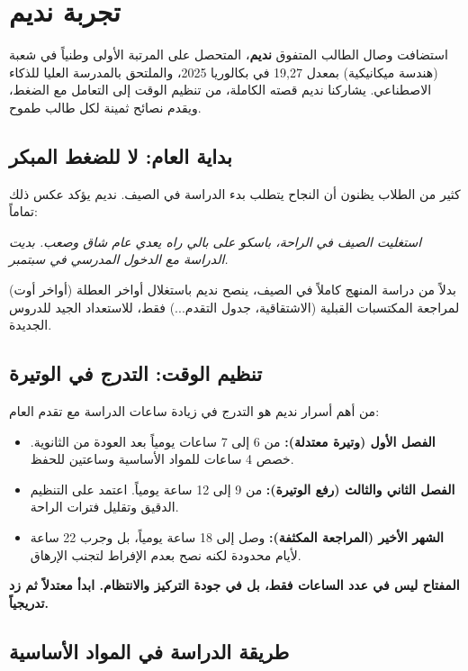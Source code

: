 \documentclass[12pt,a4paper]{book}
\newcommand{\quoteAr}[1]{%
	\begin{myquote}
		\itshape #1
	\end{myquote}
}
\newcommand{\importantAr}[1]{%
	\begin{important}
		\bfseries #1
	\end{important}
}
\begin{document}
	
	
	\section{تجربة نديم}
	
	استضافت وصال الطالب المتفوق \textbf{نديم}، المتحصل على المرتبة الأولى وطنياً في شعبة  (هندسة ميكانيكية) بمعدل 19,27 في بكالوريا 2025، والملتحق بالمدرسة العليا للذكاء الاصطناعي. يشاركنا نديم قصته الكاملة، من تنظيم الوقت إلى التعامل مع الضغط، ويقدم نصائح ثمينة لكل طالب طموح.
	
	\subsection{بداية العام: لا للضغط المبكر}
	كثير من الطلاب يظنون أن النجاح يتطلب بدء الدراسة في الصيف. نديم يؤكد عكس ذلك تماماً:
	\quoteAr{استغليت الصيف في الراحة، باسكو على بالي راه يعدي عام شاق وصعب. بديت الدراسة مع الدخول المدرسي في سبتمبر.}
	بدلاً من دراسة المنهج كاملاً في الصيف، ينصح نديم باستغلال أواخر العطلة (أواخر أوت) لمراجعة المكتسبات القبلية (الاشتقاقية، جدول التقدم...) فقط، للاستعداد الجيد للدروس الجديدة.
	
	\subsection{تنظيم الوقت: التدرج في الوتيرة}
	من أهم أسرار نديم هو التدرج في زيادة ساعات الدراسة مع تقدم العام:
	\begin{itemize}
		\item \textbf{الفصل الأول (وتيرة معتدلة):} من 6 إلى 7 ساعات يومياً بعد العودة من الثانوية. خصص 4 ساعات للمواد الأساسية وساعتين للحفظ.
		\item \textbf{الفصل الثاني والثالث (رفع الوتيرة):} من 9 إلى 12 ساعة يومياً. اعتمد على التنظيم الدقيق وتقليل فترات الراحة.
		\item \textbf{الشهر الأخير (المراجعة المكثفة):} وصل إلى 18 ساعة يومياً، بل وجرب 22 ساعة لأيام محدودة لكنه نصح بعدم الإفراط لتجنب الإرهاق.
	\end{itemize}
	\importantAr{المفتاح ليس في عدد الساعات فقط، بل في جودة التركيز \newline والانتظام. ابدأ معتدلاً ثم زد تدريجياً.}
	
	\subsection{طريقة الدراسة في المواد الأساسية }
	\label{sec:owner-experiences14}
	
\end{document}
